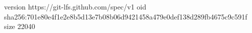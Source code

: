 version https://git-lfs.github.com/spec/v1
oid sha256:701e80e4f1e2e8b5d13e7b08b06d9421458a479e0def138d289fb4675c9c591f
size 22040
